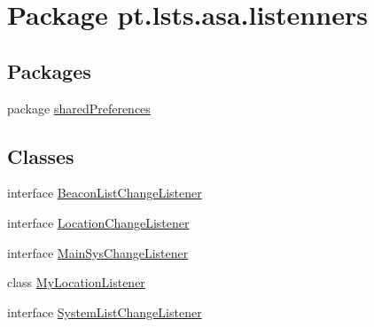 \hypertarget{namespacept_1_1lsts_1_1asa_1_1listenners}{}\section{Package pt.\+lsts.\+asa.\+listenners}
\label{namespacept_1_1lsts_1_1asa_1_1listenners}
\subsection*{Packages}
\begin{DoxyCompactItemize}
\item 
package \hyperlink{namespacept_1_1lsts_1_1asa_1_1listenners_1_1sharedPreferences}{shared\+Preferences}
\end{DoxyCompactItemize}
\subsection*{Classes}
\begin{DoxyCompactItemize}
\item 
interface \hyperlink{interfacept_1_1lsts_1_1asa_1_1listenners_1_1BeaconListChangeListener}{Beacon\+List\+Change\+Listener}
\item 
interface \hyperlink{interfacept_1_1lsts_1_1asa_1_1listenners_1_1LocationChangeListener}{Location\+Change\+Listener}
\item 
interface \hyperlink{interfacept_1_1lsts_1_1asa_1_1listenners_1_1MainSysChangeListener}{Main\+Sys\+Change\+Listener}
\item 
class \hyperlink{classpt_1_1lsts_1_1asa_1_1listenners_1_1MyLocationListener}{My\+Location\+Listener}
\item 
interface \hyperlink{interfacept_1_1lsts_1_1asa_1_1listenners_1_1SystemListChangeListener}{System\+List\+Change\+Listener}
\end{DoxyCompactItemize}
